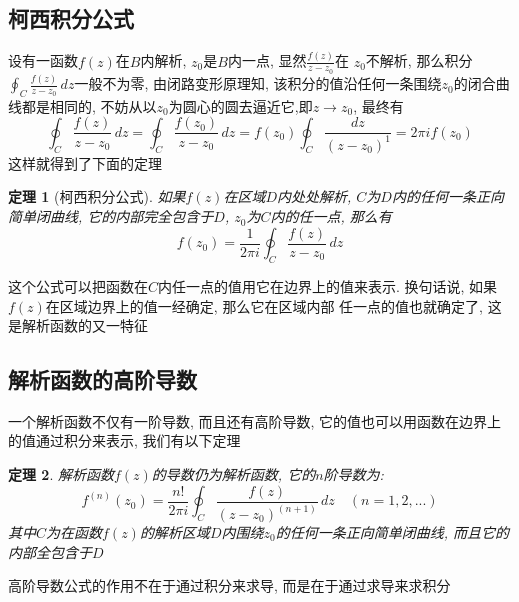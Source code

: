 \documentclass[12pt, a4paper, oneside]{ctexart}
\theoremstyle{plain}
\newtheorem{theorem}{定理}[section]
\theoremstyle{definition}
\theoremstyle{definition}
\begin{document}
\subsection{柯西积分公式}
设有一函数$f(z)$在$B$内解析, $z_0$是$B$内一点, 显然$\frac{f(z)}{z-z_0}$在
$z_0$不解析, 那么积分$\oint_{C}\frac{f(z)}{z-z_0}\,dz$一般不为零, 由闭路变形原理知, 
该积分的值沿任何一条围绕$z_0$的闭合曲线都是相同的, 不妨从以$z_0$为圆心的圆去逼近它,即$z\to z_0$, 最终有
\[
\oint_{C}\frac{f(z)}{z-z_0}\,dz=\oint_{C}\frac{f(z_0)}{z-z_0}\,dz=f(z_0)\oint_{C}\frac{dz}{(z-z_0)^1}=2\pi if(z_0)
\]
这样就得到了下面的定理
\begin{theorem}[柯西积分公式]
    如果$f(z)$在区域$D$内处处解析, $C$为$D$内的任何一条正向简单闭曲线, 它的内部完全包含于$D$, $z_0$为$C$内的任一点, 那么有
    \[
        f(z_0)=\frac{1}{2\pi i}\oint_{C}\frac{f(z)}{z-z_0}\,dz
    \]
\end{theorem}
这个公式可以把函数在$C$内任一点的值用它在边界上的值来表示. 换句话说, 如果$f(z)$在区域边界上的值一经确定, 那么它在区域内部
任一点的值也就确定了, 这是解析函数的又一特征
\subsection{解析函数的高阶导数}
一个解析函数不仅有一阶导数, 而且还有高阶导数, 它的值也可以用函数在边界上的值通过积分来表示, 我们有以下定理
\begin{theorem}
    解析函数$f(z)$的导数仍为解析函数, 它的$n$阶导数为:
    \[
        f^{(n)}(z_0)=\frac{n!}{2\pi i}\oint_{C}\frac{f(z)}{(z-z_0)^{(n+1)}}\,dz \quad (n=1,2,...)
    \]
    其中$C$为在函数$f(z)$的解析区域$D$内围绕$z_0$的任何一条正向简单闭曲线, 而且它的内部全包含于$D$
\end{theorem}
高阶导数公式的作用不在于通过积分来求导, 而是在于通过求导来求积分
\end{document}
